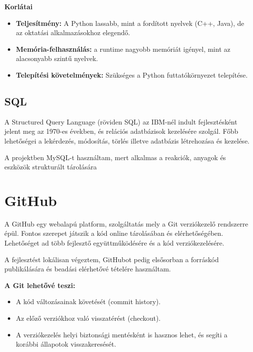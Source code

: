 \documentclass[]{thesis-ekf}
\begin{document}
	\textbf{Korlátai}
	\begin{itemize}
		\item \textbf{Teljesítmény:} A Python lassabb, mint a fordított nyelvek (C++, Java), de az oktatási alkalmazásokhoz elegendő.
		\item \textbf{Memória-felhasználás:} a runtime nagyobb memóriát igényel, mint az alacsonyabb szintű nyelvek.
		\item \textbf{Telepítési követelmények:} Szükséges a Python futtatókörnyezet telepítése.
	\end{itemize}
	
	\subsection{SQL}
	
	A Structured Query Language (röviden SQL\cite{SQL}) az IBM-nél indult fejlesztésként jelent meg az 1970-es években, és relációs adatbázisok kezelésére szolgál. Főbb lehetőségei a lekérdezés, módosítás, törlés illetve adatbázis létrehozása és kezelése.
	
	A projektben MySQL-t használtam, mert alkalmas a reakciók, anyagok és eszközök strukturált tárolására
	
	\section{GitHub}
	
	A GitHub\cite{GitHub} egy webalapú platform, szolgáltatás mely a Git\cite{Git} verziókezelő rendszerre épül. Fontos szerepet játszik a kód online tárolásában és elérhetőségében. Lehetőséget ad több fejlesztő együttműködésére és a kód verziókezelésére.
	
	A fejlesztést lokálisan végeztem, GitHubot pedig elsősorban a forráskód publikálására és beadási elérhetővé tételére használtam.
	
	\textbf{A Git lehetővé teszi:}
	\begin{itemize}
		\item A kód változásainak követését (commit history).
		\item Az előző verziókhoz való visszatérést (checkout).
		\item A verziókezelés helyi biztonsági mentésként is hasznos lehet, és segíti a korábbi állapotok visszakeresését.
		
	\end{itemize}
	
\end{document}
